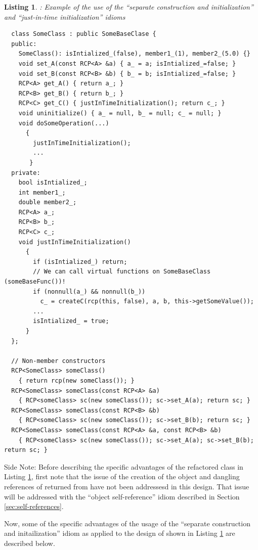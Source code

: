 \documentclass[pdf,ps2pdf,11pt]{SANDreport}
\newtheorem{listing}{Listing}
\begin{document}
\begin{listing}: Example of the use of the ``separate construction and
initialization'' and ``just-in-time initialization'' idioms  \\
\label{listing:sci:SomeClass-refactored}
{\small\begin{verbatim}
  class SomeClass : public SomeBaseClase {
  public:
    SomeClass(): isIntialized_(false), member1_(1), member2_(5.0) {}
    void set_A(const RCP<A> &a) { a_ = a; isIntialized_=false; }
    void set_B(const RCP<B> &b) { b_ = b; isIntialized_=false; }
    RCP<A> get_A() { return a_; }
    RCP<B> get_B() { return b_; }
    RCP<C> get_C() { justInTimeInitialization(); return c_; }
    void uninitialize() { a_ = null, b_ = null; c_ = null; }
    void doSomeOperation(...)
      {
        justInTimeInitialization();
        ...
       }
  private:
    bool isIntialized_;
    int member1_;
    double member2_;
    RCP<A> a_;
    RCP<B> b_;
    RCP<C> c_;
    void justInTimeInitialization()
      {
        if (isIntialized_) return;
        // We can call virtual functions on SomeBaseClass (someBaseFunc())!
        if (nonnull(a_) && nonnull(b_))
          c_ = createC(rcp(this, false), a, b, this->getSomeValue());
        ...
        isIntialized_ = true;
      }
  };

  // Non-member constructors
  RCP<SomeClass> someClass()
    { return rcp(new someClass()); }
  RCP<SomeClass> someClass(const RCP<A> &a)
    { RCP<someClass> sc(new someClass()); sc->set_A(a); return sc; }
  RCP<SomeClass> someClass(const RCP<B> &b)
    { RCP<someClass> sc(new someClass()); sc->set_B(b); return sc; }
  RCP<SomeClass> someClass(const RCP<A> &a, const RCP<B> &b)
    { RCP<someClass> sc(new someClass()); sc->set_A(a); sc->set_B(b);  return sc; }
\end{verbatim}}
\end{listing}


Side Note: Before describing the specific advantages of the refactored
class in Listing {}\ref{listing:sci:SomeClass-refactored}, first
note that the issue of the creation of the {} object and
dangling references of {} returned from
{} have not been addressesd in this design.  That
issue will be addressed with the ``object self-reference'' idiom
described in Section {}\ref{sec:self-references}.

Now, some of the specific advantages of the usage of the ``separate
construction and initailization'' idiom as applied to the design of
{} shown in Listing
{}\ref{listing:sci:SomeClass-refactored} are described below.
\end{document}
